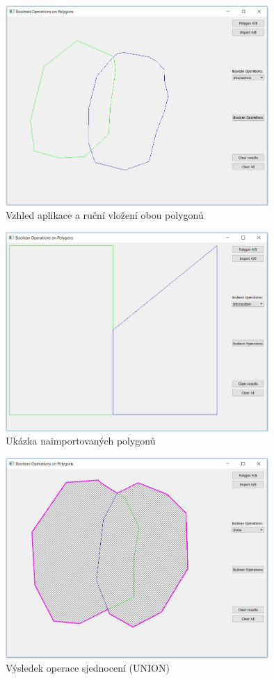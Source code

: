 \documentclass[a4paper, 12pt]{article}
\begin{document}
\begin{figure}[h!]
\centering
\includegraphics[width=10cm]{pictures/polygons.jpg}
\caption{Vzhled aplikace a ruční vložení obou polygonů}
\end{figure}

\begin{figure}[h!]
\centering
\includegraphics[width=10cm]{pictures/import.jpg}
\caption{Ukázka naimportovaných polygonů}
\end{figure}

\begin{figure}[h!]
\centering
\includegraphics[width=10cm]{pictures/union.jpg}
\caption{Výsledek operace sjednocení (UNION)}
\end{figure}
\end{document}
